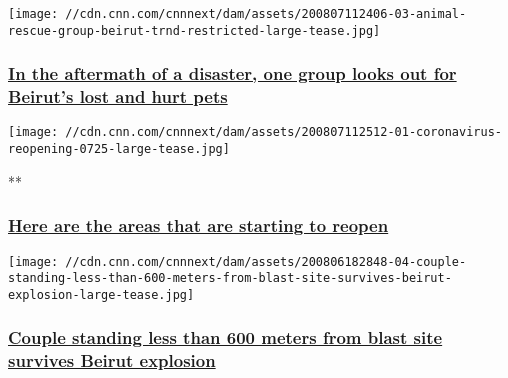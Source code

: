 \href{/2020/08/07/world/beirut-animal-rescue-reuniting-pets-trnd/index.html}{}

\texttt{[image: //cdn.cnn.com/cnnnext/dam/assets/200807112406-03-animal-rescue-group-beirut-trnd-restricted-large-tease.jpg]}

\hypertarget{in-the-aftermath-of-a-disaster-one-group-looks-out-for-beiruts-lost-and-hurt-pets}{%
\subsubsection{\texorpdfstring{\href{/2020/08/07/world/beirut-animal-rescue-reuniting-pets-trnd/index.html}{In
the aftermath of a disaster, one group looks out for Beirut's lost and
hurt
pets}}{In the aftermath of a disaster, one group looks out for Beirut's lost and hurt pets}}\label{in-the-aftermath-of-a-disaster-one-group-looks-out-for-beiruts-lost-and-hurt-pets}}

\href{/2020/04/24/world/gallery/coronavirus-after-lockdown/index.html}{}

\texttt{[image: //cdn.cnn.com/cnnnext/dam/assets/200807112512-01-coronavirus-reopening-0725-large-tease.jpg]}

**

\hypertarget{here-are-the-areas-that-are-starting-to-reopen}{%
\subsubsection{\texorpdfstring{\href{/2020/04/24/world/gallery/coronavirus-after-lockdown/index.html}{Here
are the areas that are starting to
reopen}}{Here are the areas that are starting to reopen}}\label{here-are-the-areas-that-are-starting-to-reopen}}

\href{/2020/08/06/world/beirut-explosion-survivors-trnd/index.html}{}

\texttt{[image: //cdn.cnn.com/cnnnext/dam/assets/200806182848-04-couple-standing-less-than-600-meters-from-blast-site-survives-beirut-explosion-large-tease.jpg]}

\hypertarget{couple-standing-less-than-600-meters-from-blast-site-survives-beirut-explosion}{%
\subsubsection{\texorpdfstring{\href{/2020/08/06/world/beirut-explosion-survivors-trnd/index.html}{Couple
standing less than 600 meters from blast site survives Beirut
explosion}}{Couple standing less than 600 meters from blast site survives Beirut explosion}}\label{couple-standing-less-than-600-meters-from-blast-site-survives-beirut-explosion}}

